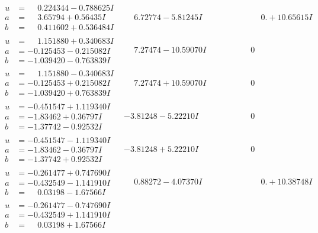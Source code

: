 \documentclass[1p]{elsarticle_modified}
\theoremstyle{definition}
\begin{document}
$$\begin{array}{c|c|c}
\begin{aligned}
u &= \phantom{-}0.224344 - 0.788625 I \\
a &= \phantom{-}3.65794 + 0.56435 I \\
b &= \phantom{-}0.411602 + 0.536484 I\end{aligned}
 & \phantom{-}6.72774 - 5.81245 I & \phantom{-0.000000 -}0. + 10.65615 I \\ \hline\begin{aligned}
u &= \phantom{-}1.151880 + 0.340683 I \\
a &= -0.125453 - 0.215082 I \\
b &= -1.039420 - 0.763839 I\end{aligned}
 & \phantom{-}7.27474 - 10.59070 I & \phantom{-0.000000 } 0 \\ \hline\begin{aligned}
u &= \phantom{-}1.151880 - 0.340683 I \\
a &= -0.125453 + 0.215082 I \\
b &= -1.039420 + 0.763839 I\end{aligned}
 & \phantom{-}7.27474 + 10.59070 I & \phantom{-0.000000 } 0 \\ \hline\begin{aligned}
u &= -0.451547 + 1.119340 I \\
a &= -1.83462 + 0.36797 I \\
b &= -1.37742 - 0.92532 I\end{aligned}
 & -3.81248 - 5.22210 I & \phantom{-0.000000 } 0 \\ \hline\begin{aligned}
u &= -0.451547 - 1.119340 I \\
a &= -1.83462 - 0.36797 I \\
b &= -1.37742 + 0.92532 I\end{aligned}
 & -3.81248 + 5.22210 I & \phantom{-0.000000 } 0 \\ \hline\begin{aligned}
u &= -0.261477 + 0.747690 I \\
a &= -0.432549 - 1.141910 I \\
b &= \phantom{-}0.03198 - 1.67566 I\end{aligned}
 & \phantom{-}0.88272 - 4.07370 I & \phantom{-0.000000 -}0. + 10.38748 I \\ \hline\begin{aligned}
u &= -0.261477 - 0.747690 I \\
a &= -0.432549 + 1.141910 I \\
b &= \phantom{-}0.03198 + 1.67566 I\end{aligned}

\end{array}$$
\end{document}
